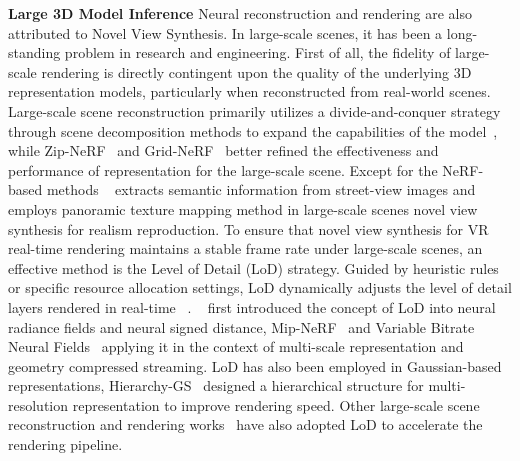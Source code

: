 


\textbf{Large 3D Model Inference} Neural reconstruction and rendering are also attributed to Novel View Synthesis. In large-scale scenes, it has been a long-standing problem in research and engineering. First of all, the fidelity of large-scale rendering is directly contingent upon the quality of the underlying 3D representation models, particularly when reconstructed from real-world scenes. Large-scale scene reconstruction primarily utilizes a divide-and-conquer strategy through scene decomposition methods to expand the capabilities of the model~\cite{tancik2022block, turki2022mega}, while Zip-NeRF~\cite{barron2023zip} and Grid-NeRF~\cite{xu2023grid} better refined the effectiveness and performance of representation for the large-scale scene. Except for the NeRF-based methods ~\cite{park2021instant} extracts semantic information from street-view images and employs panoramic texture mapping method in large-scale scenes novel view synthesis for realism reproduction. To ensure that novel view synthesis for VR real-time rendering maintains a stable frame rate under large-scale scenes, an effective method is the Level of Detail (LoD) strategy.  Guided by heuristic rules or specific resource allocation settings, LoD dynamically adjusts the level of detail layers rendered in real-time ~\cite{Luebke2012LevelOD}. ~\cite{takikawa2021neural} first introduced the concept of LoD into neural radiance fields and neural signed distance, Mip-NeRF~\cite{barron2021mip} and Variable Bitrate Neural Fields~\cite{takikawa2022variable} applying it in the context of multi-scale representation and geometry compressed streaming. LoD has also been employed in Gaussian-based representations, Hierarchy-GS~\cite{kerbl2024hierarchical} designed a hierarchical structure for multi-resolution representation to improve rendering speed. Other large-scale scene reconstruction and rendering works~\cite{xu2023vr, lu2024scaffold, ren2024octree, liu2025citygaussian} have also adopted LoD to accelerate the rendering pipeline.




